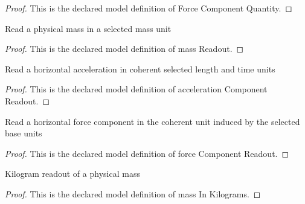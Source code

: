 \begin{proof}
  This is the declared model definition of Force Component Quantity.
\end{proof}
\begin{definition}
  \label{def:physics:phyx-mini-0804:phyxminiproblems-problemphyxmini0804-massreadout}
  Read a physical mass in a selected mass unit
\end{definition}
\begin{proof}
  This is the declared model definition of mass Readout.
\end{proof}
\begin{definition}
  \label{def:physics:phyx-mini-0804:phyxminiproblems-problemphyxmini0804-accelerationcomponentreadout}
  Read a horizontal acceleration in coherent selected length and time units
\end{definition}
\begin{proof}
  This is the declared model definition of acceleration Component Readout.
\end{proof}
\begin{definition}
  \label{def:physics:phyx-mini-0804:phyxminiproblems-problemphyxmini0804-forcecomponentreadout}
  Read a horizontal force component in the coherent unit induced by the selected base units
\end{definition}
\begin{proof}
  This is the declared model definition of force Component Readout.
\end{proof}
\begin{definition}
  \label{def:physics:phyx-mini-0804:phyxminiproblems-problemphyxmini0804-massinkilograms}
  Kilogram readout of a physical mass
\end{definition}
\begin{proof}
  This is the declared model definition of mass In Kilograms.
\end{proof}
